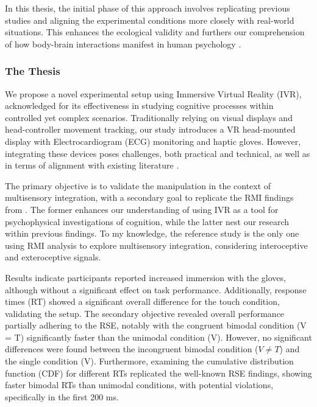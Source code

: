 \documentclass[12pt,oneside,openright]{report}
\begin{document}
In this thesis, the initial phase of this approach involves replicating previous studies and aligning the experimental conditions more closely with real-world situations. This enhances the ecological validity and furthers our comprehension of how body-brain interactions manifest in human psychology \parencite{schmuckler2001ecological}. 


\subsubsection*{The Thesis}

We propose a novel experimental setup using Immersive Virtual Reality (IVR), acknowledged for its effectiveness in studying cognitive processes within controlled yet complex scenarios. Traditionally relying on visual displays and head-controller movement tracking, our study introduces a VR head-mounted display with Electrocardiogram (ECG) monitoring and haptic gloves. However, integrating these devices poses challenges, both practical and technical, as well as in terms of alignment with existing literature \parencite{Klotzsche2023}.

The primary objective is to validate the manipulation in the context of multisensory integration, with a secondary goal to replicate the RMI findings from \textcite{SALTAFOSSI2023108642}. The former enhances our understanding of using IVR as a tool for psychophysical investigations of cognition, while the latter nest our research within previous findings. To my knowledge, the reference study is the only one using RMI analysis to explore multisensory integration, considering interoceptive and exteroceptive signals.

Results indicate participants reported increased immersion with the gloves, although without a significant effect on task performance. Additionally, response times (RT) showed a significant overall difference for the touch condition, validating the setup. The secondary objective revealed overall performance partially adhering to the RSE, notably with the congruent bimodal condition (V = T) significantly faster than the unimodal condition (V). However, no significant differences were found between the incongruent bimodal condition ($V \neq T$) and the single condition (V). Furthermore, examining the cumulative distribution function (CDF) for different RTs replicated the well-known RSE findings, showing faster bimodal RTs than unimodal conditions, with potential violations, specifically in the first 200 ms.
\end{document}
